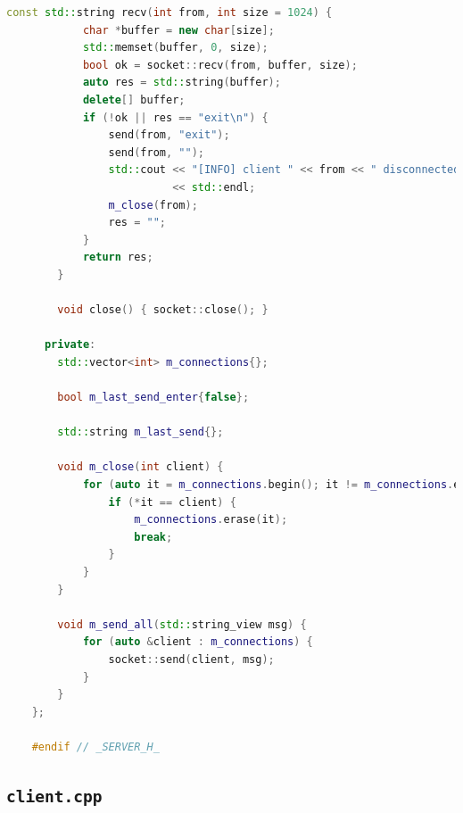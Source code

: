 \documentclass{article}
\begin{document}
\begin{lstlisting}[language=C++]
        const std::string recv(int from, int size = 1024) {
            char *buffer = new char[size];
            std::memset(buffer, 0, size);
            bool ok = socket::recv(from, buffer, size);
            auto res = std::string(buffer);
            delete[] buffer;
            if (!ok || res == "exit\n") {
                send(from, "exit");
                send(from, "");
                std::cout << "[INFO] client " << from << " disconnected"
                          << std::endl;
                m_close(from);
                res = "";
            }
            return res;
        }
    
        void close() { socket::close(); }
    
      private:
        std::vector<int> m_connections{};
    
        bool m_last_send_enter{false};
    
        std::string m_last_send{};
    
        void m_close(int client) {
            for (auto it = m_connections.begin(); it != m_connections.end(); ++it) {
                if (*it == client) {
                    m_connections.erase(it);
                    break;
                }
            }
        }
    
        void m_send_all(std::string_view msg) {
            for (auto &client : m_connections) {
                socket::send(client, msg);
            }
        }
    };
    
    #endif // _SERVER_H_    
\end{lstlisting}

\subsection{\texttt{client.cpp}}
\end{document}
